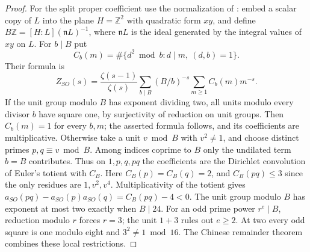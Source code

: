 \begin{proof}
For the split proper coefficient use the normalization of
\cite[Thm.~1.1]{Hyperbolic}: embed a scalar copy of \(L\) into the plane
\(H=\mathbb Z^2\) with quadratic form \(xy\), and define
\(B\mathbb Z=[H:L](\mathfrak nL)^{-1}\), where \(\mathfrak nL\) is the ideal
generated by the integral values of \(xy\) on \(L\).
For \(b\mid B\) put
\[
 C_b(m)=\#\{d^2\bmod b:d\mid m,\ (d,b)=1\}.
\]
Their formula is
\[
 Z_{SO}(s)=\frac{\zeta(s-1)}{\zeta(s)}
     \sum_{b\mid B}(B/b)^{-s}\sum_{m\ge1}C_b(m)m^{-s}.
\]
If the unit group modulo \(B\) has exponent dividing two, all units
modulo every divisor \(b\) have square one, by surjectivity of reduction
on unit groups. Then \(C_b(m)=1\) for every \(b,m\); the asserted formula
follows, and its coefficients are multiplicative.
Otherwise take a unit \(v\bmod B\) with \(v^2\ne1\), and choose
distinct primes \(p,q\equiv v\bmod B\). Among indices coprime to \(B\)
only the undilated term \(b=B\) contributes. Thus on \(1,p,q,pq\)
the coefficients are the Dirichlet convolution of Euler's totient with \(C_B\).
Here \(C_B(p)=C_B(q)=2\), and \(C_B(pq)\le3\) since the only residues
are \(1,v^2,v^4\). Multiplicativity of the totient gives
\(a_{SO}(pq)-a_{SO}(p)a_{SO}(q)=C_B(pq)-4<0\).
The unit group modulo \(B\) has exponent at most two exactly when \(B\mid24\).
For an odd prime power \(r^e\mid B\), reduction modulo \(r\) forces \(r=3\);
the unit \(1+3\) rules out \(e\ge2\). At two every odd square is
one modulo eight and \(3^2\ne1\bmod16\). The Chinese remainder theorem combines these local restrictions.
\end{proof}
